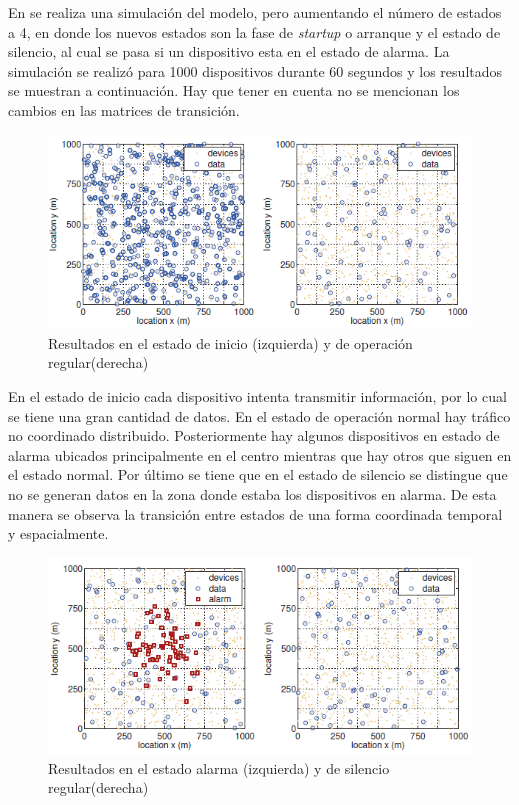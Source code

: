 \documentclass[journal]{IEEEtran}
\begin{document}
En \cite{art3} se realiza una simulaci\'on del modelo, pero aumentando el n\'umero de estados a 4, en donde los nuevos estados son la fase de \emph{startup} o arranque y el estado de silencio, al cual se pasa si un dispositivo esta en el estado de alarma. La simulaci\'on se realiz\'o para 1000 dispositivos durante 60 segundos y los resultados se muestran a continuaci\'on. Hay que tener en cuenta no se mencionan los cambios en las matrices de transici\'on.

\begin{figure}[h]
\centering
\includegraphics[scale=0.7]{graf3}
\caption{Resultados en el estado de inicio (izquierda) y de operaci\'on regular(derecha)}
\label{CMMPP1}
\end{figure}

En el estado de inicio cada dispositivo intenta transmitir informaci\'on, por lo cual se tiene una gran cantidad de datos. En el estado de operaci\'on normal hay tr\'afico no coordinado distribuido. Posteriormente hay algunos dispositivos en estado de alarma ubicados principalmente en el centro mientras que hay otros que siguen en el estado normal. Por \'ultimo se tiene que en el estado de silencio se distingue que no se generan datos en la zona donde estaba los dispositivos en alarma. De esta manera se observa la transici\'on entre estados de una forma coordinada temporal y espacialmente.

\begin{figure}[h]
\centering
\includegraphics[scale=0.7]{graf4}
\caption{Resultados en el estado alarma (izquierda) y de silencio regular(derecha)}
\label{CMMPP2}
\end{figure}
\end{document}
